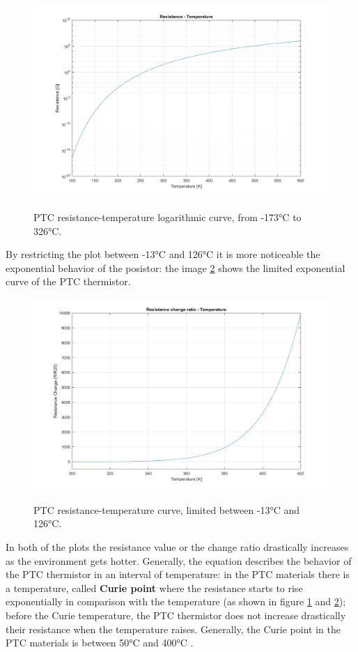 \begin{figure}[h]
    \centering
    \includegraphics[width = .75\textwidth]{../res/plots/PTC_logarithmic.png}
    \label{fig:PTC_logarithmic}
    \caption{PTC resistance-temperature logarithmic curve, from -173°C to 326°C.}
\end{figure}

\FloatBarrier\noindent By restricting the plot between -13°C and 126°C it is more noticeable the exponential behavior of the posistor: the image \ref{fig:PTC_ratio} shows the limited exponential curve of the PTC thermistor.

\begin{figure}[h]
    \centering
    \includegraphics[width = .75\textwidth]{../res/plots/PTC_ratio.png}
    \label{fig:PTC_ratio}
    \caption{PTC resistance-temperature curve, limited between -13°C and 126°C.}
\end{figure}

\FloatBarrier\noindent In both of the plots the resistance value or the change ratio drastically increases as the environment gets hotter. Generally, the equation describes the behavior of the PTC thermistor in an interval of temperature: in the PTC materials there is a temperature, called \textbf{Curie point} where the resistance starts to rise exponentially in comparison with the temperature (as shown in figure \ref{fig:PTC_logarithmic} and \ref{fig:PTC_ratio}); before the Curie temperature, the PTC thermistor does not increase drastically their resistance when the temperature raises. Generally, the Curie point in the PTC materials is between 50°C and 400°C \cite{Cheng2014441}.

